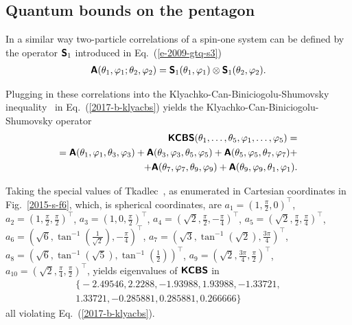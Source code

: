 \documentclass[%
  twocolumn,
 showpacs,
 showkeys,
 preprintnumbers,
 amsmath,amssymb,
 aps,
  pra,
  longbibliography,
 floatfix,
 ]{revtex4-1}
\begin{document}
\subsection{Quantum bounds on the pentagon}


In a similar way  two-particle correlations of a spin-one system can be defined by the operator $\textsf{\textbf{S}}_1$
introduced in Eq.~(\ref{e-2009-gtq-s3})
\begin{equation}
\begin{split}
\textsf{\textbf{A}} (\theta_1 ,\varphi_1;\theta_2 ,\varphi_2)
=
\textsf{\textbf{S}}_1 (\theta_1 ,\varphi_1) \otimes
\textsf{\textbf{S}}_1 (\theta_2 ,\varphi_2)
.
\end{split}
\label{e-2017-b-whatever-e6}
\end{equation}

Plugging in these correlations into the Klyachko-Can-Biniciogolu-Shumovsky inequality~\cite{Klyachko-2008} in Eq.~(\ref{2017-b-klyacbs})
yields  the Klyachko-Can-Biniciogolu-Shumovsky operator
\begin{equation}
\begin{split}
\textsf{\textbf{KCBS}}( \theta_1, \ldots , \theta_5 ,\varphi_1, \ldots ,\varphi_5)=\\=
\textsf{\textbf{A}}( \theta_1,\varphi_1, \theta_3,\varphi_3) +
\textsf{\textbf{A}} ( \theta_3,\varphi_3, \theta_5,\varphi_5) +
\textsf{\textbf{A}} ( \theta_5,\varphi_5, \theta_7,\varphi_7 ) +   \\
+\textsf{\textbf{A}} ( \theta_7,\varphi_7, \theta_9,\varphi_9)  +
\textsf{\textbf{A}} ( \theta_9,\varphi_9, \theta_1,\varphi_1)
.
\end{split}
\label{e-2017-b-whatever-e7}
\end{equation}

Taking the special values of Tkadlec~\cite{tkadlec-priv-1995},
as enumerated in Cartesian coordinates in Fig.~\ref{2015-s-f6}, which, is spherical coordinates, are
$a_{1} = \left(   1 , \frac{\pi }{2} , 0  \right)^\intercal$,
$a_{2} = \left(   1 , \frac{\pi }{2} , \frac{\pi }{2}  \right)^\intercal$,
$a_{3} = \left(   1 , 0 , \frac{\pi }{2}  \right)^\intercal$,
$a_{4} = \left(   \sqrt{2} , \frac{\pi }{2} , -\frac{\pi }{4}  \right)^\intercal$,
$a_{5} = \left(   \sqrt{2} , \frac{\pi }{2} , \frac{\pi }{4}  \right)^\intercal$,
$a_{6} = \left(   \sqrt{6} , \tan ^{-1}\left(\frac{1}{\sqrt{2}}\right) , -\frac{\pi }{4}  \right)^\intercal$,
$a_{7} = \left(   \sqrt{3} , \tan ^{-1}\left(\sqrt{2}\right) , \frac{3 \pi }{4}  \right)^\intercal$,
$a_{8} = \left(   \sqrt{6} , \tan ^{-1}\left(\sqrt{5}\right) , \tan ^{-1}\left(\frac{1}{2}\right)  \right)^\intercal$,
$a_{9} = \left(   \sqrt{2} , \frac{3 \pi }{4} , \frac{\pi }{2}  \right)^\intercal$,
$a_{10} = \left(  \sqrt{2} , \frac{\pi }{4} , \frac{\pi }{2}  \right)^\intercal$,
 yields  eigenvalues of $\textsf{\textbf{KCBS}}$ in
\begin{equation}
\begin{split}
\big\{-2.49546, 2.2288, -1.93988, 1.93988, -1.33721, \\
1.33721, -0.285881, 0.285881, 0.266666\big\}
\end{split}
\label{e-2017-b-whatever-e7kcbs}
\end{equation}
all violating Eq.~(\ref{2017-b-klyacbs}).
\end{document}
